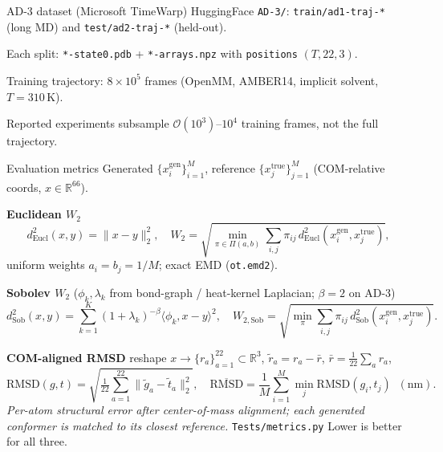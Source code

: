\documentclass[aspectratio=169,11pt]{beamer}
\begin{document}
\begin{frame}{AD-3 dataset (Microsoft TimeWarp)}
  \small
  HuggingFace \texttt{AD-3/}: \texttt{train/ad1-traj-*} (long MD) and \texttt{test/ad2-traj-*} (held-out).

  \vspace{0.45em}
  Each split: \texttt{*-state0.pdb} + \texttt{*-arrays.npz} with \texttt{positions} $(T,22,3)$.

  \vspace{0.45em}
  Training trajectory: $8{\times}10^5$ frames (OpenMM, AMBER14, implicit solvent, $T{=}310$\,K).

  \vspace{0.45em}
  Reported experiments subsample $\mathcal{O}(10^3)$--$10^4$ training frames, not the full trajectory.
  \normalsize
\end{frame}

\begin{frame}{Evaluation metrics}
  \footnotesize
  Generated $\{x_i^{\mathrm{gen}}\}_{i=1}^{M}$, reference $\{x_j^{\mathrm{true}}\}_{j=1}^{M}$ (COM-relative coords, $x \in \mathbb{R}^{66}$).

  \vspace{0.3em}
  \textbf{Euclidean $W_2$}
  \[
    d_{\mathrm{Eucl}}^2(x,y)=\|x-y\|_2^2,\quad
    W_2=\sqrt{\min_{\pi\in\Pi(a,b)}\sum_{i,j}\pi_{ij}\,d_{\mathrm{Eucl}}^2(x_i^{\mathrm{gen}},x_j^{\mathrm{true}})},
  \]
  uniform weights $a_i=b_j=1/M$; exact EMD (\texttt{ot.emd2}).

  \vspace{0.25em}
  \textbf{Sobolev $W_2$} \quad ($\phi_k,\lambda_k$ from bond-graph / heat-kernel Laplacian; $\beta{=}2$ on AD-3)
  \[
    d_{\mathrm{Sob}}^2(x,y)=\sum_{k=1}^{K}(1+\lambda_k)^{-\beta}\langle\phi_k,x-y\rangle^2,\quad
    W_{2,\mathrm{Sob}}=\sqrt{\min_{\pi}\sum_{i,j}\pi_{ij}\,d_{\mathrm{Sob}}^2(x_i^{\mathrm{gen}},x_j^{\mathrm{true}})}.
  \]

  \vspace{0.25em}
  \textbf{COM-aligned RMSD} \quad reshape $x\to\{r_a\}_{a=1}^{22}\subset\mathbb{R}^3$, $\tilde{r}_a=r_a-\bar{r}$, $\bar{r}=\frac{1}{22}\sum_a r_a$,
  \[
    \mathrm{RMSD}(g,t)=\sqrt{\tfrac{1}{22}\sum_{a=1}^{22}\|\tilde{g}_a-\tilde{t}_a\|_2^2},\quad
    \overline{\mathrm{RMSD}}=\frac{1}{M}\sum_{i=1}^{M}\min_{j}\mathrm{RMSD}(g_i,t_j)\;\;(\text{nm}).
  \]
  \textit{Per-atom structural error after center-of-mass alignment; each generated conformer is matched to its closest reference.}
  \scriptsize
  \texttt{Tests/metrics.py} \quad Lower is better for all three.
\end{frame}
\end{document}
